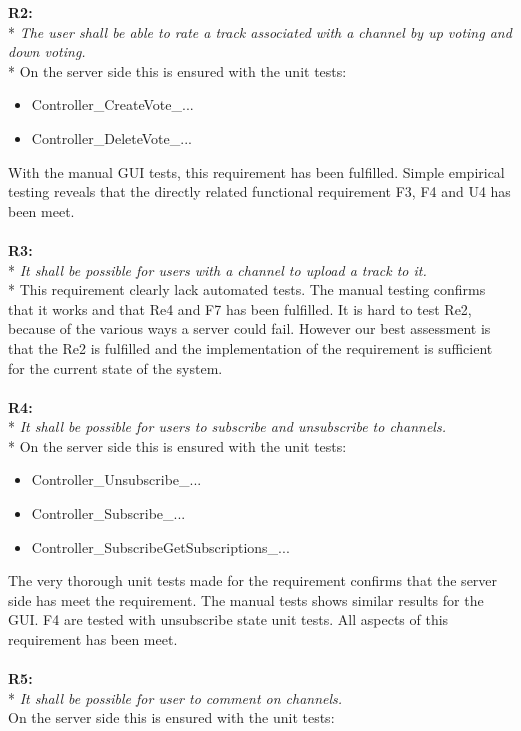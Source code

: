 \documentclass[a4paper,11pt,report]{article}
\begin{document}
{\textbf{R2:} \\*
\textit{The user shall be able to rate a track associated with a channel by up voting and down voting.} \\*
On the server side this is ensured with the unit tests:
\begin{itemize}
\item Controller\_CreateVote\_...
\item Controller\_DeleteVote\_...
\end{itemize}
With the manual GUI tests, this requirement has been fulfilled. Simple empirical testing reveals that the directly related functional requirement F3, F4 and U4 has been meet. \\ \\
\textbf{R3:} \\*
\textit{It shall be possible for users with a channel to upload a track to it.} \\*
This requirement clearly lack automated tests. The manual testing confirms that it works and that Re4 and F7 has been fulfilled. It is hard to test Re2, because of the various ways a server could fail. However our best assessment is that the Re2 is fulfilled and the implementation of the requirement is sufficient for the current state of the system. \\ \\
\textbf{R4:} \\*
\textit{It shall be possible for users to subscribe and unsubscribe to channels.} \\*
On the server side this is ensured with the unit tests:
\begin{itemize}
\item Controller\_Unsubscribe\_...
\item Controller\_Subscribe\_...
\item Controller\_SubscribeGetSubscriptions\_...
\end{itemize}
The very thorough unit tests made for the requirement confirms that the server side has meet the requirement. The manual tests shows similar results for the GUI. F4 are tested with unsubscribe state unit tests. All aspects of this requirement has been meet. \\ \\
\textbf{R5:} \\*
\textit{It shall be possible for user to comment on channels.} \\
On the server side this is ensured with the unit tests:
\begin{itemize}

\end{itemize}}
\end{document}
